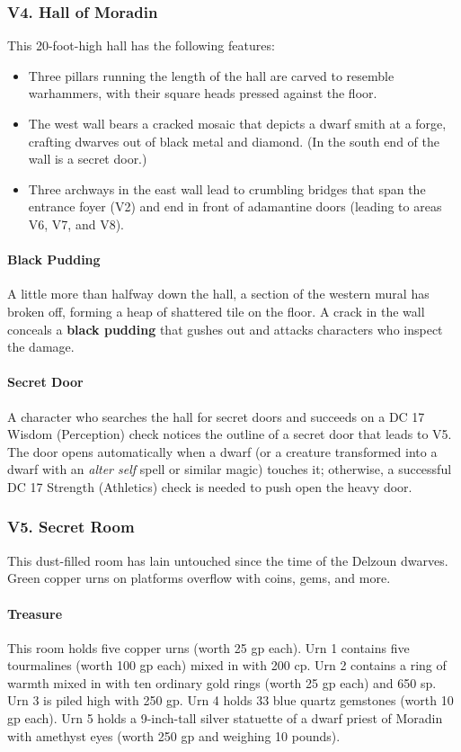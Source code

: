 \documentclass[10pt,a4paper,twoside,twocolumn,openany,nodeprecatedcode]{dndbook}
\begin{document}
\subsubsection{V4. Hall of Moradin}
This 20-foot-high hall has the following features:
\begin{itemize}

\item Three pillars running the length of the hall are carved to resemble warhammers, with their square heads pressed against the floor.
\item The west wall bears a cracked mosaic that depicts a dwarf smith at a forge, crafting dwarves out of black metal and diamond. (In the south end of the wall is a secret door.)
\item Three archways in the east wall lead to crumbling bridges that span the entrance foyer (V2) and end in front of adamantine doors (leading to areas V6, V7, and V8).
\end{itemize}


\paragraph{Black Pudding}
A little more than halfway down the hall, a section of the western mural has broken off, forming a heap of shattered tile on the floor. A crack in the wall conceals a \textbf{black pudding} that gushes out and attacks characters who inspect the damage.
\paragraph{Secret Door}
A character who searches the hall for secret doors and succeeds on a DC 17 Wisdom (Perception) check notices the outline of a secret door that leads to V5. The door opens automatically when a dwarf (or a creature transformed into a dwarf with an \textit{alter self} spell or similar magic) touches it; otherwise, a successful DC 17 Strength (Athletics) check is needed to push open the heavy door.
\subsubsection{V5. Secret Room}
This dust-filled room has lain untouched since the time of the Delzoun dwarves. Green copper urns on platforms overflow with coins, gems, and more.
\paragraph{Treasure}
This room holds five copper urns (worth 25 gp each). Urn 1 contains five tourmalines (worth 100 gp each) mixed in with 200 cp. Urn 2 contains a ring of warmth mixed in with ten ordinary gold rings (worth 25 gp each) and 650 sp. Urn 3 is piled high with 250 gp. Urn 4 holds 33 blue quartz gemstones (worth 10 gp each). Urn 5 holds a 9-inch-tall silver statuette of a dwarf priest of Moradin with amethyst eyes (worth 250 gp and weighing 10 pounds).
\end{document}
